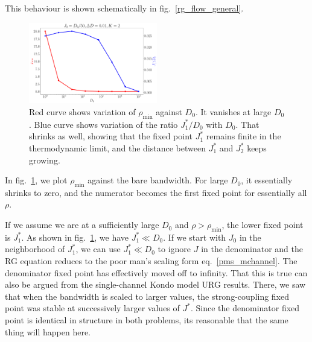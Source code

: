 \documentclass{revtex4-2}
\numberwithin{equation}{section}
\begin{document}
This behaviour is shown schematically in fig.~\ref{rg_flow_general}. 
\begin{figure}[!htb]
	\centering
	\includegraphics[width=0.5\textwidth]{./rhomin_D.pdf}
	\caption{Red curve shows variation of \(\rho_\text{min}\) against \(D_0\). It vanishes at large \(D_0\). Blue curve shows variation of the ratio \(J_1^* / D_0\) with \(D_0\). That shrinks as well, showing that the fixed point \(J_1^*\) remains finite in the thermodynamic limit, and the distance between \(J_1^*\) and \(J_2^*\) keeps growing.}
	\label{rhomin_vs_D}
\end{figure}
In fig.~\ref{rhomin_vs_D}, we plot \(\rho_\text{min}\) against the bare bandwidth. For large \(D_0\), it essentially shrinks to zero, and the numerator becomes the first fixed point for essentially all \(\rho\).

If we assume we are at a sufficiently large \(D_0\) and \(\rho > \rho_\text{min}\), the lower fixed point is \(J_1^*\). As shown in fig.~\ref{rhomin_vs_D}, we have \(J_1^* \ll D_0\). If we start with \(J_0\) in the neighborhood of \(J_1^*\), we can use \(J_1^* \ll D_0\) to ignore \(J\) in the denominator and the RG equation reduces to the poor man's scaling form eq.~\ref{pms_mchannel}. The denominator fixed point has effectively moved off to infinity. That this is true can also be argued from the single-channel Kondo model URG results. There, we saw that when the bandwidth is scaled to larger values, the strong-coupling fixed point was stable at successively larger values of \(J^*\). Since the denominator fixed point is identical in structure in both problems, its reasonable that the same thing will happen here.
\end{document}
